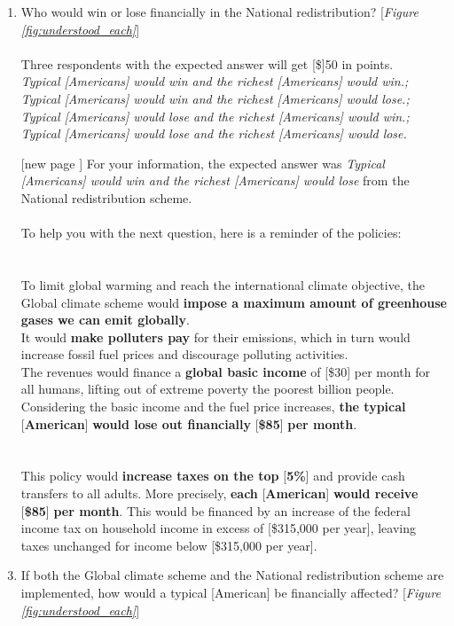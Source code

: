 \begin{enumerate}[resume]
\item \label{q:understood_nr} Who would win or lose financially in the National redistribution? [\textit{Figure \ref{fig:understood_each}}] ~\\
\\
Three respondents with the expected answer will get [\$]50 in points.
\\ \textit{Typical [Americans] would win and the richest [Americans] would win.; Typical [Americans] would win and the richest [Americans] would lose.; Typical [Americans] would lose and the richest [Americans] would win.; Typical [Americans] would lose and the richest [Americans] would lose.}
\item[[new page\!\!\!]] For your information, the expected answer was \textit{Typical [Americans] would win and the richest [Americans] would lose} from the National redistribution scheme. \\ 
\\
To help you with the next question, here is a reminder of the policies:\\
\\
\textbf{}\\ 
To limit global warming and reach the international climate objective, the Global climate scheme would \textbf{impose a maximum amount of greenhouse gases we can emit globally}.\\
It would \textbf{make polluters pay} for their emissions, which in turn would increase fossil fuel prices and discourage polluting activities.\\
The revenues would finance a \textbf{global basic income} of [\$30] per month for all humans, lifting out of extreme poverty the poorest billion people.\\
Considering the basic income and the fuel price increases, \textbf{the typical }[\textbf{American}]\textbf{ would lose out financially }[\textbf{\$85}]\textbf{ per month}.\\
\\
\textbf{} \\This policy would \textbf{increase taxes on the top }[\textbf{5\%}] and provide cash transfers to all adults. More precisely, \textbf{each }[\textbf{American}]\textbf{ would receive }[\textbf{\$85}]\textbf{ per month}. This would be financed by an increase of the federal income tax on household income in excess of [\$315,000 per year], leaving taxes unchanged for income below [\$315,000 per year].
\item \label{q:understood_both} If both the Global climate scheme and the National redistribution scheme are implemented, how would a typical [American] be financially affected? [\textit{Figure \ref{fig:understood_each}}] \\

\end{enumerate}

